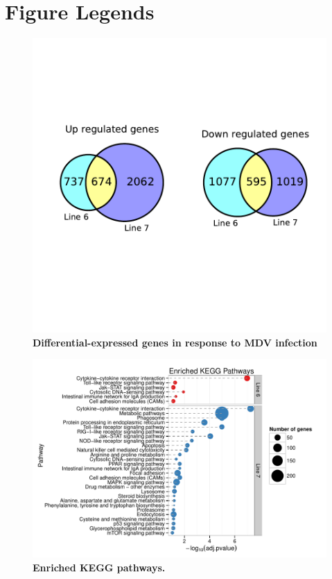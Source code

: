 \documentclass[10pt]{article}
\begin{document}
\section*{Figure Legends}

\begin{figure}[!ht]
    \begin{center}
        \includegraphics[width=6in]{degenes_venn.pdf}
    \end{center}
    \caption{
        {\bf Differential-expressed genes in response to MDV infection}
    }
    \label{degenes_venn}
\end{figure}

\begin{figure}[!ht]
    \begin{center}
        \includegraphics[width=7in]{line67_KEGG_cleveland.pdf}
    \end{center}
    \caption{
        {\bf Enriched KEGG pathways.}
    }
    \label{line67_kegg}
\end{figure}
\end{document}
